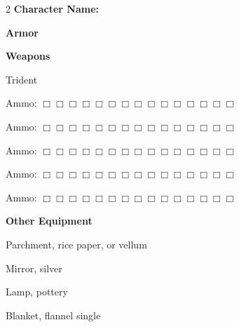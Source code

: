 \documentclass[10pt]{article}
\begin{document}
\begin{multicols}{2}
\textbf{Character Name:} \hrulefill

\vspace{24pt}

\textbf{Armor}




\hrulefill


\hrulefill


\hrulefill


\hrulefill



\vspace{24pt}

\textbf{Weapons}


Trident




\hrulefill

Ammo: $\Box \Box \Box \Box \Box \Box \Box \Box \Box \Box \Box \Box \Box \Box \Box$ 


\hrulefill

Ammo: $\Box \Box \Box \Box \Box \Box \Box \Box \Box \Box \Box \Box \Box \Box \Box$ 


\hrulefill

Ammo: $\Box \Box \Box \Box \Box \Box \Box \Box \Box \Box \Box \Box \Box \Box \Box$ 


\hrulefill

Ammo: $\Box \Box \Box \Box \Box \Box \Box \Box \Box \Box \Box \Box \Box \Box \Box$ 


\hrulefill

Ammo: $\Box \Box \Box \Box \Box \Box \Box \Box \Box \Box \Box \Box \Box \Box \Box$ 



\vspace{24pt}

\textbf{Other Equipment}


Parchment, rice paper, or vellum


Mirror, silver


Lamp, pottery


Blanket, flannel single




\hrulefill


\hrulefill


\hrulefill


\hrulefill


\hrulefill


\hrulefill


\hrulefill


\hrulefill



\end{multicols}
\end{document}
